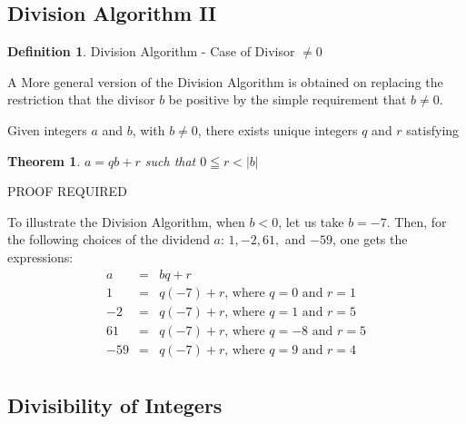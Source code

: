 \documentclass{book}
\newtheorem{theorem}{Theorem}[section]
\theoremstyle{definition}
\newtheorem{definition}{Definition}[section]
\theoremstyle{remark}
\begin{document}
\subsection{Division Algorithm II}
\begin{definition}
Division Algorithm - Case of Divisor $ \neq 0$

A More general version of the Division Algorithm is obtained on replacing the restriction that the divisor $b$ be positive by the simple requirement that $b \neq 0$. 

Given integers $a$ and $b$, with $b \neq 0$, there exists unique integers $q$ and $r$ satisfying 
\begin{tcolorbox}
	\begin{theorem}
		$a = qb + r$ such that $0 \leqq r < |b|$
	\end{theorem} 
\end{tcolorbox}
PROOF REQUIRED


To illustrate the Division Algorithm, when $b < 0$, let us take $b=-7$. Then, for the following choices of the dividend $a$: $1,-2,61,$ and $-59$, one gets the expressions:
	\begin{eqnarray*}
		a & = & bq + r \nonumber \\		
		1 & = & q(-7) + r \text{, where }q=0 \text{ and } r=1  \nonumber \\	
		-2 & = & q(-7) + r \text{, where }q=1 \text{ and } r=5  \nonumber \\	
		61 & = & q(-7) + r \text{, where }q=-8 \text{ and } r=5  \nonumber \\	
		-59 & = & q(-7) + r \text{, where }q=9 \text{ and } r=4  \nonumber \\	
	\end{eqnarray*}
\end{definition} 




\newpage
\subsection{Divisibility of Integers}
\end{document}
